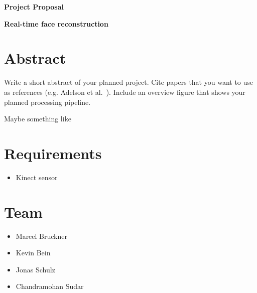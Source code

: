 \documentclass[a4paper,pagesize 10pt]{scrartcl}
\begin{document}
\begin{center}{\Huge\textbf{Project Proposal}}\end{center}
\begin{center}{\Large\textbf{Real-time face reconstruction}}\end{center}

\section{Abstract}

%
Write a short abstract of your planned project.
%
Cite papers that you want to use as references (e.g. Adelson et al.~\cite{adelson1984pyramid}).
%
Include an overview figure that shows your planned processing pipeline.
%


Maybe something like \cite{jaredsanson}

\section{Requirements}
\begin{itemize}	
	\item Kinect sensor
\end{itemize}

\section{Team}
\begin{itemize}
\item Marcel Bruckner
\item Kevin Bein
\item Jonas Schulz
\item Chandramohan Sudar
\end{itemize}


{\small
	
	
}
\end{document}
